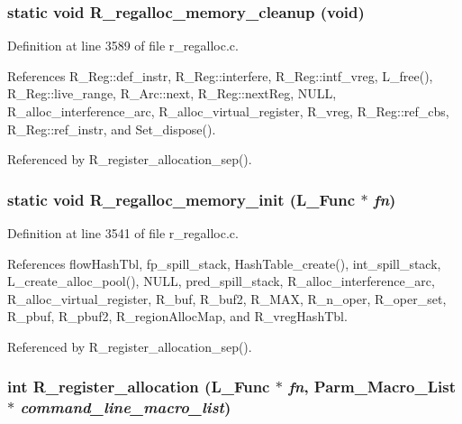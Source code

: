 \subsubsection{\setlength{\rightskip}{0pt plus 5cm}static void R\_\-regalloc\_\-memory\_\-cleanup (void)\hspace{0.3cm}{\tt  [static]}}\label{r__regalloc_8c_62eb740c643d3011c9a74f838bbab7bb}




Definition at line 3589 of file r\_\-regalloc.c.

References R\_\-Reg::def\_\-instr, R\_\-Reg::interfere, R\_\-Reg::intf\_\-vreg, L\_\-free(), R\_\-Reg::live\_\-range, R\_\-Arc::next, R\_\-Reg::next\-Reg, NULL, R\_\-alloc\_\-interference\_\-arc, R\_\-alloc\_\-virtual\_\-register, R\_\-vreg, R\_\-Reg::ref\_\-cbs, R\_\-Reg::ref\_\-instr, and Set\_\-dispose().

Referenced by R\_\-register\_\-allocation\_\-sep().
\subsubsection{\setlength{\rightskip}{0pt plus 5cm}static void R\_\-regalloc\_\-memory\_\-init (L\_\-Func $\ast$ {\em fn})\hspace{0.3cm}{\tt  [static]}}\label{r__regalloc_8c_4f261e6dcac3f54d96103dddb572a1e1}




Definition at line 3541 of file r\_\-regalloc.c.

References flow\-Hash\-Tbl, fp\_\-spill\_\-stack, Hash\-Table\_\-create(), int\_\-spill\_\-stack, L\_\-create\_\-alloc\_\-pool(), NULL, pred\_\-spill\_\-stack, R\_\-alloc\_\-interference\_\-arc, R\_\-alloc\_\-virtual\_\-register, R\_\-buf, R\_\-buf2, R\_\-MAX, R\_\-n\_\-oper, R\_\-oper\_\-set, R\_\-pbuf, R\_\-pbuf2, R\_\-region\-Alloc\-Map, and R\_\-vreg\-Hash\-Tbl.

Referenced by R\_\-register\_\-allocation\_\-sep().
\subsubsection{\setlength{\rightskip}{0pt plus 5cm}int R\_\-register\_\-allocation (L\_\-Func $\ast$ {\em fn}, \bf{Parm\_\-Macro\_\-List} $\ast$ {\em command\_\-line\_\-macro\_\-list})}\label{r__regalloc_8c_766b8fbafc0b01f083fcbf6dbd406441}




